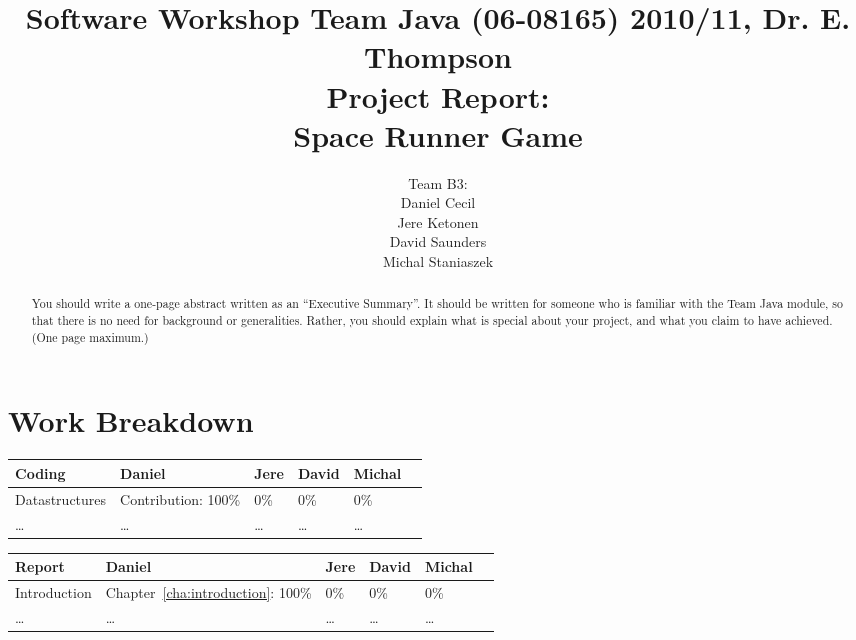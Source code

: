 \documentclass[10pt]{report}
\title{%
{\normalsize Software Workshop Team Java (06-08165) 2010/11, Dr. E. Thompson}\\[2cm]
Project Report:\\
Space Runner Game}
\author{Team B3:\\
Daniel Cecil\\
Jere Ketonen\\
David Saunders\\
Michal Staniaszek
}
\begin{document}
\maketitle
\chapter*{Work Breakdown}
\label{work-breakdown}

\thispagestyle{empty}

{\small

\noindent\begin{tabular}{|l||l|l|l|l|l|}\hline
  \textbf{Coding} & \textbf{Daniel} & \textbf{Jere} & \textbf{David}
 & \textbf{Michal} \\\hline\hline
 Datastructures & Contribution: 100\% & 0\% & 0\% & 0\%\\\hline
 \ldots & \ldots & \ldots & \ldots & \ldots \\\hline
\end{tabular}\vspace*{1cm}

\noindent\begin{tabular}{|l||l|l|l|l|l|}\hline
  \textbf{Report} & \textbf{Daniel} & \textbf{Jere} & \textbf{David}
 & \textbf{Michal}\\\hline\hline
 Introduction & Chapter~\ref{cha:introduction}: 100\% & 0\% & 0\% & 0\%\\\hline
 \ldots & \ldots & \ldots & \ldots & \ldots \\\hline
\end{tabular}

}     %

\tableofcontents
\thispagestyle{empty}

\begin{abstract}
  You should write a one-page abstract written as an ``Executive Summary''. It
  should be written for someone who is familiar with the Team Java module, so
  that there is no need for background or generalities. Rather, you should
  explain what is special about your project, and what you claim to have
  achieved. (One page maximum.)
\end{abstract}






\end{document}
